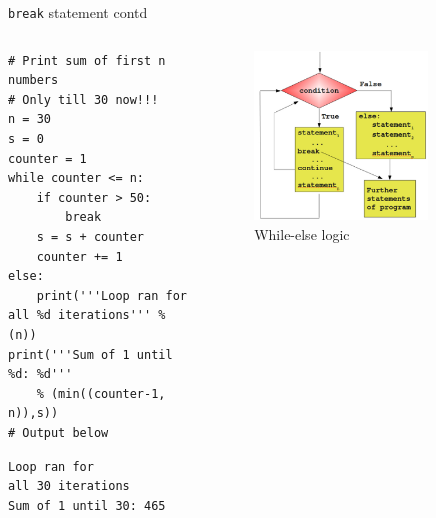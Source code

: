 \documentclass[presentation]{beamer}
\begin{document}
\begin{frame}[label={sec:org4945f20},fragile]{\texttt{break} statement contd}
 \begin{columns}
\begin{column}{0.48\columnwidth}
\scriptsize
\begin{verbatim}
# Print sum of first n numbers
# Only till 30 now!!!
n = 30
s = 0
counter = 1
while counter <= n:
    if counter > 50:
        break
    s = s + counter
    counter += 1
else:
    print('''Loop ran for
all %d iterations''' % (n))
print('''Sum of 1 until %d: %d'''
    % (min((counter-1, n)),s))
# Output below
\end{verbatim}

\begin{verbatim}
Loop ran for
all 30 iterations
Sum of 1 until 30: 465
\end{verbatim}
\end{column}

\begin{column}{0.45\columnwidth}
\footnotesize
\begin{figure}[htbp]
\centering
\includegraphics[width=0.8\textwidth]{images/while_loop_with_else_break.png}
\caption{While-else logic}
\end{figure}
\end{column}
\end{columns}
\end{frame}
\end{document}
